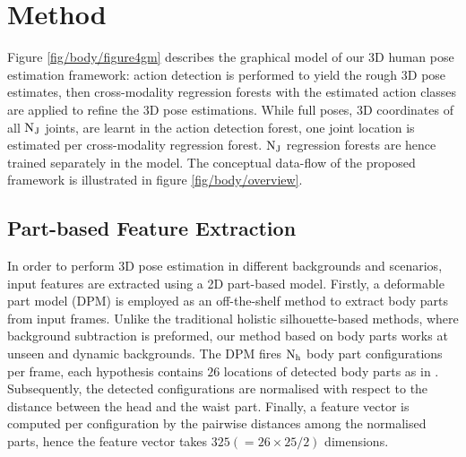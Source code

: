 \section{Method}
\label{sec/body/method}

Figure \ref{fig/body/figure4gm} describes the graphical model of our 3D human pose estimation framework: action detection is performed to yield the rough 3D pose estimates, then cross-modality regression forests with the estimated action classes are applied to refine the 3D pose estimations. While full poses, \ie 3D coordinates of all $\mathrm{N_{J}}$ joints, are learnt in the action detection forest, one joint location is estimated per cross-modality regression forest. $\mathrm{N_{J}}$ regression forests are hence trained separately in the model. The conceptual data-flow of the proposed framework is illustrated in figure \ref{fig/body/overview}.


\subsection{Part-based Feature Extraction}

In order to perform 3D pose estimation in different backgrounds and scenarios, input features are extracted using a 2D part-based model. 
Firstly, a deformable part model (DPM) \cite{Yang2011} is employed as an off-the-shelf method to extract body parts from input frames.
Unlike the traditional holistic silhouette-based methods, where background subtraction is preformed, our method based on body parts works at unseen and dynamic backgrounds. 
The DPM fires $\mathrm{N_{h}}$ body part configurations per frame, each hypothesis contains $26$ locations of detected body parts as in \cite{Yang2011}. 
Subsequently, the detected configurations are normalised with respect to the distance between the head and the waist part. 
Finally, a feature vector is computed per configuration by the pairwise distances among the normalised parts, hence the feature vector takes $325 (=26\times25/2)$ dimensions.

